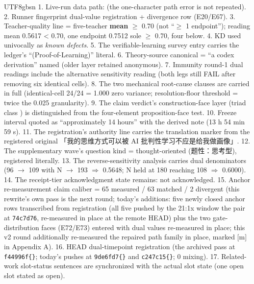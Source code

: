 \documentclass[11pt,letterpaper]{article}
\begin{document}
\begin{CJK}{UTF8}{gbsn}
1. Live-run data path:  (the one-character path error is not repeated). 2. Runner fingerprint dual-value registration + divergence row (E20/E67). 3. Teacher-quality line = five-teacher \textbf{mean} \ensuremath{\geq} 0.70 (not ``\ensuremath{\geq} 1 endpoint''); reading mean 0.5617 < 0.70, one endpoint 0.7512 sole \ensuremath{\geq} 0.70, four below. 4. KD used univocally as \emph{known defects}. 5. The verifiable-learning survey entry carries the ledger's ``(Proof-of-Learning)'' literal. 6. Theory-source canonical = ``a codex derivation'' named (older layer retained anonymous). 7. Immunity round-1 dual readings include the alternative sensitivity reading (both legs still FAIL after removing six identical cells). 8. The two mechanical root-cause clauses are carried in full (identical-cell 24/24 = 1.000 zero variance; resolution-floor threshold = twice the 0.025 granularity). 9. The claim verdict's construction-face layer (triad class ) is distinguished from the four-element proposition-face test. 10. Freeze interval quoted as ``approximately 14 hours'' with the derived note (13 h 54 min 59 s). 11. The registration's authority line carries the translation marker from the registered original 「我的思维方式可以被 AI 批判性学习\textellipsis{}\textellipsis{}不应是给我做画像」. 12. The supplementary wave's question kind = thought-oriented (题性：思考型), registered literally. 13. The reverse-sensitivity analysis carries dual denominators (96 \ensuremath{\to} 109 with N \ensuremath{\to} 193 \ensuremath{\Rightarrow} 0.5648; N held at 180 reaching 108 \ensuremath{\Rightarrow} 0.6000). 14. The receipt-tier acknowledgment state remains: not acknowledged. 15. Anchor re-measurement claim caliber = 65 measured / 63 matched / 2 divergent (this rewrite's own pass is the next round; today's additions: five newly closed anchor rows transcribed from registration (all five pushed by the 21:1x window \textemdash{} the pair at \texttt{74c7d76}, re-measured in place at the remote HEAD) plus the two gate-distribution faces (E72/E73) entered with dual values re-measured in place; this v2 round additionally re-measured the repaired path family in place, marked [m] in Appendix A). 16. HEAD dual-timepoint registration (the archived pass at \texttt{f44996f\textellipsis\{\}}; today's pushes at \texttt{9de6fd7\textellipsis\{\}} and \texttt{c247c15\textellipsis\{\}}; 0 mixing). 17. Related-work slot-status sentences are synchronized with the actual slot state (one open slot stated as open).


\end{CJK}
\end{document}
